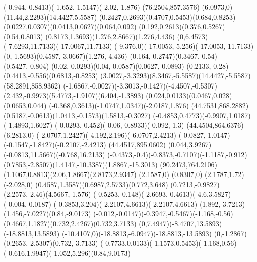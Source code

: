 {    \rcurveto(-0.944,-0.8413)(-1.652,-1.5147)(-2.02,-1.876)
    \moveto(76.2504,857.3576)
    \rcurveto(6.0973,0)(11.44,2.2293)(14.4427,5.5587)
    \rcurveto(0.2427,0.2693)(0.4707,0.5453)(0.684,0.8253)
    \rcurveto(0.0227,0.0307)(0.0413,0.0627)(0.064,0.092)
    \rcurveto(0.192,0.2613)(0.376,0.5267)(0.54,0.8013)
    \rcurveto(0.8173,1.3693)(1.276,2.8667)(1.276,4.436)
    \rcurveto(0,6.4573)(-7.6293,11.7133)(-17.0067,11.7133)
    \rcurveto(-9.376,0)(-17.0053,-5.256)(-17.0053,-11.7133)
    \rcurveto(0,-1.5693)(0.4587,-3.0667)(1.276,-4.436)
    \rcurveto(0.164,-0.2747)(0.3467,-0.54)(0.5427,-0.804)
    \rcurveto(0.02,-0.0293)(0.04,-0.0587)(0.0627,-0.0893)
    \rcurveto(0.2133,-0.28)(0.4413,-0.556)(0.6813,-0.8253)
    \rcurveto(3.0027,-3.3293)(8.3467,-5.5587)(14.4427,-5.5587)
    \moveto(58.2891,858.9362)
    \rcurveto(-1.6867,-0.0027)(-3.3013,-0.1427)(-4.4507,-0.5307)
    \rcurveto(2.432,-0.9973)(5.4773,-1.9107)(6.404,-1.3893)
    \rcurveto(0.024,0.0133)(0.0467,0.028)(0.0653,0.044)
    \rcurveto(-0.368,0.3613)(-1.0747,1.0347)(-2.0187,1.876)
    \moveto(44.7531,868.2882)
    \rcurveto(0.5187,-0.0613)(1.0413,-0.1573)(1.5813,-0.3027)
    \rcurveto(-0.4853,0.4773)(-0.9907,1.0187)(-1.4893,1.6027)
    \rcurveto(-0.0293,-0.452)(-0.06,-0.8933)(-0.092,-1.3)
    \moveto(44.4504,864.6376)
    \rlineto(6.2813,0)
    \rcurveto(-2.0707,1.2427)(-4.192,2.196)(-6.0707,2.4213)
    \rcurveto(-0.0827,-1.0147)(-0.1547,-1.8427)(-0.2107,-2.4213)
    \moveto(44.4517,895.0602)
    \rcurveto(0.044,3.9267)(-0.0813,11.5667)(-0.768,16.2133)
    \rcurveto(-0.4373,-0.4)(-0.8373,-0.7107)(-1.1187,-0.912)
    \rcurveto(0.7853,-2.8507)(1.4147,-10.3387)(1.8867,-15.3013)
    \closepath
    \moveto(90.2473,764.2106)
    \rcurveto(1.1067,0.8813)(2.06,1.8667)(2.8173,2.9347)
    \rlineto(2.1587,0)
    \rlineto(0.8307,0)
    \rlineto(2.1787,1.72)
    \rlineto(-2.028,0)
    \rcurveto(0.4587,1.3587)(0.6987,2.5733)(0.772,3.648)
    \rcurveto(0.7213,-0.9827)(2.2573,-2.46)(4.5667,-1.576)
    \rcurveto(-0.5253,-0.148)(-2.6693,-0.4613)(-4.6,3.5827)
    \rlineto(-0.004,-0.0187)
    \rcurveto(-0.3853,3.204)(-2.2107,4.6613)(-2.2107,4.6613)
    \rcurveto(1.892,-3.7213)(1.456,-7.0227)(0.84,-9.0173)
    \rcurveto(-0.012,-0.0147)(-0.3947,-0.5467)(-1.168,-0.56)
    \rcurveto(0.4667,1.1827)(0.732,2.4267)(0.732,3.7133)
    \rcurveto(0,7.4947)(-8.4707,13.5893)(-18.8813,13.5893)
    \rcurveto(-10.4107,0)(-18.8813,-6.0947)(-18.8813,-13.5893)
    \rcurveto(0,-1.2867)(0.2653,-2.5307)(0.732,-3.7133)
    \rcurveto(-0.7733,0.0133)(-1.1573,0.5453)(-1.168,0.56)
    \rcurveto(-0.616,1.9947)(-1.052,5.296)(0.84,9.0173)
}
